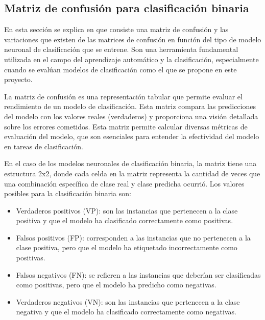 \subsection{Matriz de confusión para clasificación binaria} \label{sec.matriz-consfusion}
En esta sección se explica en que consiste una matriz de confusión y las variaciones que existen de las matrices de confusión en función del tipo de modelo neuronal de clasificación que se entrene. Son una herramienta fundamental utilizada en el campo del aprendizaje automático y la clasificación, especialmente cuando se evalúan modelos de clasificación como el que se propone en este proyecto.

La matriz de confusión es una representación tabular que permite evaluar el rendimiento de un modelo de clasificación. Esta matriz compara las predicciones del modelo con los valores reales (verdaderos) y proporciona una visión detallada sobre los errores cometidos. Esta matriz permite calcular diversas métricas de evaluación del modelo, que son esenciales para entender la efectividad del modelo en tareas de clasificación.

En el caso de los modelos neuronales de clasificación binaria, la matriz tiene una estructura 2x2, donde cada celda en la matriz representa la cantidad de veces que una combinación específica de clase real y clase predicha ocurrió. Los valores posibles para la clasificación binaria son: 

\begin{itemize}

	\item Verdaderos positivos (VP): son las instancias que pertenecen a la clase positiva y que el modelo ha clasificado correctamente como positivas.

    \item Falsos positivos (FP): corresponden a las instancias que no pertenecen a la clase positiva, pero que el modelo ha etiquetado incorrectamente como positivas.

    \item Falsos negativos (FN): se refieren a las instancias que deberían ser clasificadas como positivas, pero que el modelo ha predicho como negativas.

    \item Verdaderos negativos (VN): son las instancias que pertenecen a la clase negativa y que el modelo ha clasificado correctamente como negativas.

\end{itemize}



